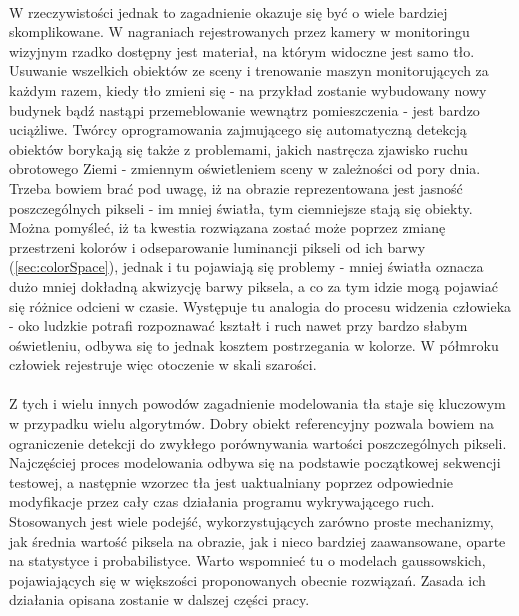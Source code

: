 \paragraph{}
W rzeczywistości jednak to zagadnienie okazuje się być o wiele bardziej skomplikowane. W nagraniach rejestrowanych przez kamery w monitoringu wizyjnym rzadko dostępny jest materiał, na którym widoczne jest samo tło. Usuwanie wszelkich obiektów ze sceny i trenowanie maszyn monitorujących za każdym razem, kiedy tło zmieni się - na przykład zostanie wybudowany nowy budynek bądź nastąpi przemeblowanie wewnątrz pomieszczenia - jest bardzo uciążliwe. Twórcy oprogramowania zajmującego się automatyczną detekcją obiektów borykają się także z problemami, jakich nastręcza zjawisko ruchu obrotowego Ziemi - zmiennym oświetleniem sceny w zależności od pory dnia. Trzeba bowiem brać pod uwagę, iż na obrazie reprezentowana jest jasność poszczególnych pikseli - im mniej światła, tym ciemniejsze stają się obiekty. Można pomyśleć, iż ta kwestia rozwiązana zostać może poprzez zmianę przestrzeni kolorów i odseparowanie luminancji pikseli od ich barwy (\ref{sec:colorSpace}), jednak i tu pojawiają się problemy - mniej światła oznacza dużo mniej dokładną akwizycję barwy piksela, a co za tym idzie mogą pojawiać się różnice odcieni w czasie. Występuje tu analogia do procesu widzenia człowieka - oko ludzkie potrafi rozpoznawać kształt i ruch nawet przy bardzo słabym oświetleniu, odbywa się to jednak kosztem postrzegania w kolorze. W półmroku człowiek rejestruje więc otoczenie w skali szarości.
\paragraph{}
Z tych i wielu innych powodów zagadnienie modelowania tła staje się kluczowym w przypadku wielu algorytmów. Dobry obiekt referencyjny pozwala bowiem na ograniczenie detekcji do zwykłego porównywania wartości poszczególnych pikseli. Najczęściej proces modelowania odbywa się na podstawie początkowej sekwencji testowej, a następnie wzorzec tła jest uaktualniany poprzez odpowiednie modyfikacje przez cały czas działania programu wykrywającego ruch. Stosowanych jest wiele podejść, wykorzystujących zarówno proste mechanizmy, jak średnia wartość piksela na obrazie, jak i nieco bardziej zaawansowane, oparte na statystyce i probabilistyce. Warto wspomnieć tu o modelach gaussowskich, pojawiających się w większości proponowanych obecnie rozwiązań. Zasada ich działania opisana zostanie w dalszej części pracy.

